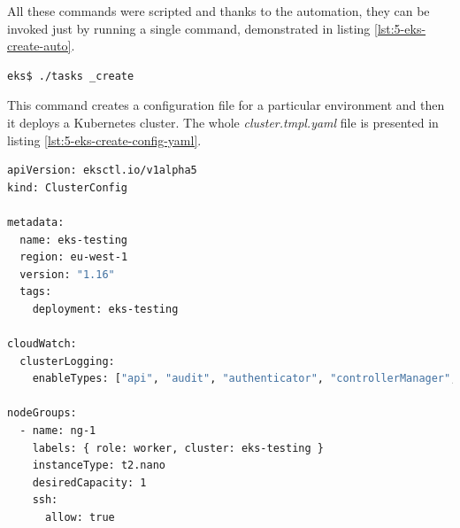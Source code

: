 All these commands were scripted and thanks to the automation, they can be invoked just by running a single command, demonstrated in listing \ref{lst:5-eks-create-auto}.
\begin{lstlisting}[basicstyle=\scriptsize,xleftmargin=0cm,label=lst:5-eks-create-auto,caption={Creating a Kubernetes cluster with \textit{eksctl}},captionpos=b,language=Bash ]
eks$ ./tasks _create
\end{lstlisting}
This command creates a configuration file for a particular environment and then it deploys a Kubernetes cluster. The whole \textit{cluster.tmpl.yaml} file is presented in listing \ref{lst:5-eks-create-config-yaml}.
\begin{lstlisting}[basicstyle=\scriptsize,xleftmargin=0cm,label=lst:5-eks-create-config-yaml,caption={\textit{Eksctl} configuration file},captionpos=b,language=Bash ]
apiVersion: eksctl.io/v1alpha5
kind: ClusterConfig

metadata:
  name: eks-testing
  region: eu-west-1
  version: "1.16"
  tags:
    deployment: eks-testing

cloudWatch:
  clusterLogging:
    enableTypes: ["api", "audit", "authenticator", "controllerManager", "scheduler"]

nodeGroups:
  - name: ng-1
    labels: { role: worker, cluster: eks-testing }
    instanceType: t2.nano
    desiredCapacity: 1
    ssh:
      allow: true

\end{lstlisting}

